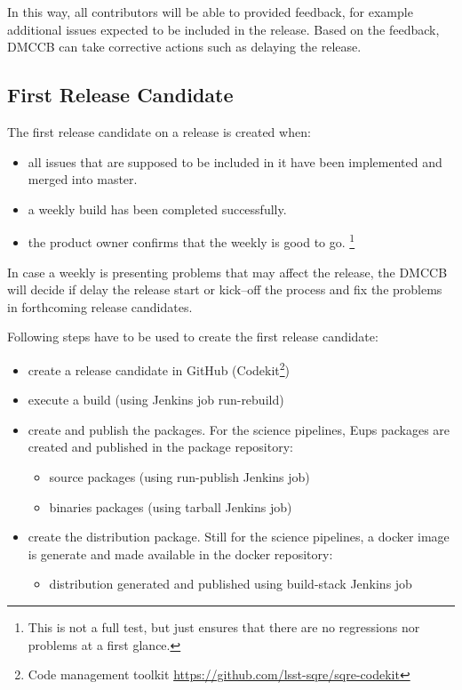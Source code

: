 In this way, all contributors will be able to provided feedback, for example additional issues expected to be included in the release.
Based on the feedback, DMCCB can take corrective actions such as delaying the release.


\subsection{First Release Candidate} \label{sec:firstrc}

The first release candidate on a release is created when:

\begin{itemize}
\item all issues that are supposed to be included in it have been implemented and merged into master.
\item a weekly build has been completed successfully.
\item the product owner confirms that the weekly is good to go. \footnote{This is not a full test, but just ensures that there are no regressions nor problems at a first glance.}
\end{itemize}

In case a weekly is presenting problems that may affect the release, the DMCCB will decide if delay the release start or kick--off the process and fix the problems in forthcoming release candidates.


Following steps have to be used to create the first release candidate:

\begin{itemize}
\item create a release candidate in GitHub (Codekit\footnote{Code management toolkit \url{https://github.com/lsst-sqre/sqre-codekit}})
\item execute a build (using Jenkins job run-rebuild)
\item create and publish the packages. For the science pipelines, Eups packages are created and published in the package repository:
   \begin{itemize}
   \item source packages (using run-publish Jenkins job)
   \item binaries packages (using tarball Jenkins job)
   \end{itemize}
\item create the distribution package. Still for the science pipelines, a docker image is generate and made available in the docker repository:
   \begin{itemize}
   \item distribution generated and published using build-stack Jenkins job
   \end{itemize}
\end{itemize}


